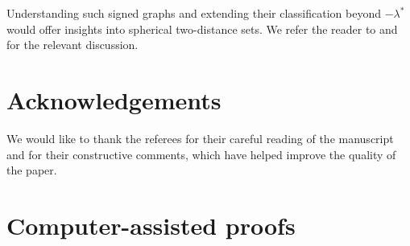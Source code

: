 \documentclass[11pt]{article}
\theoremstyle{definition}
\theoremstyle{remark}
\newcommand{\las}{\lambda^*}
\begin{document}
Understanding such signed graphs and extending their classification beyond $-\las$ would offer insights into spherical two-distance sets. We refer the reader to \cite[Section~5]{JP25} and \cite{JW25} for the relevant discussion.

\section*{Acknowledgements} We would like to thank the referees for their careful reading of the manuscript and for their constructive comments, which have helped improve the quality of the paper.




\appendix

\section{Computer-assisted proofs} \label{sec:app}
\end{document}
